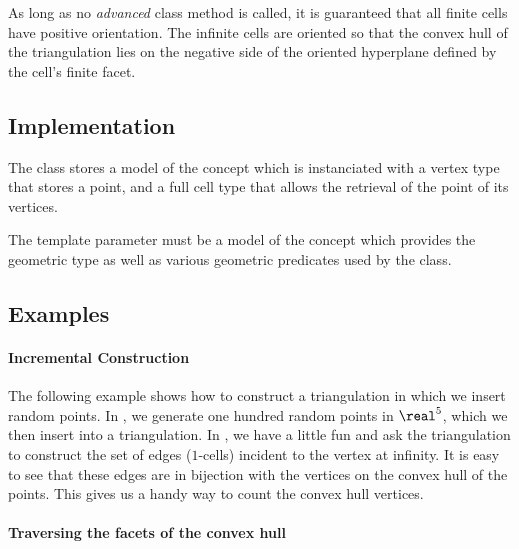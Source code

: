 {{As long as no \emph{advanced} class method is called, it is guaranteed that
all finite cells have positive orientation. The infinite cells are
oriented so that the convex hull of the triangulation lies on the negative side of
the oriented hyperplane defined by the cell's finite facet.



\subsection{Implementation}

The class  stores a model 
of the concept  which is instanciated with a
vertex type that stores a point, and a full cell type that allows the retrieval
of the point of its vertices.

The template parameter  must be a model of the concept
 which provides the geometric  type as well
as various geometric predicates used by the  class.


\subsection{Examples}

\paragraph{Incremental Construction}

The following example shows how to construct a triangulation in which we insert
random points. In , we generate one hundred random points in
$\real^5$, which we then insert into a triangulation. In , we have
a little fun and ask the triangulation to construct the set of edges
($1$-cells) incident to the vertex at infinity. It is easy to see that
these edges are in bijection with the vertices on the convex hull of the
points. This gives us a handy way to count the convex hull vertices.


\paragraph{Traversing the facets of the convex hull}

}}
